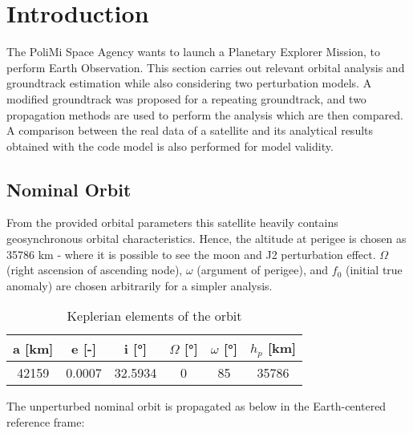 \section{Introduction}
\label{sec:introduction_cap2}

The PoliMi Space Agency wants to launch a Planetary Explorer Mission, to  perform  Earth Observation. This section carries out relevant orbital analysis and groundtrack estimation while also considering two perturbation models. A modified groundtrack was proposed for a repeating groundtrack, and two propagation methods are used to perform the analysis which are then compared. A comparison between the real data of a satellite and its analytical results obtained with the code model is also performed for model validity.


\subsection{Nominal Orbit}

From the provided orbital parameters this satellite heavily contains geosynchronous orbital characteristics. Hence, the altitude at perigee is chosen as 35786 km \cite{perigee_alt} - where it is possible to see the moon and J2 perturbation effect. $\Omega$ (right ascension of ascending node), $\omega$ (argument of perigee), and $f_0$ (initial true anomaly) are chosen arbitrarily for a simpler analysis.

\begin{table}[ht]
	\centering
	\label{tab:keplerian_elements}
	\begin{tabular}{|c|c|c|c|c|c|}
		\hline
		a [km] & e [-] & i [°] & $\Omega$ [°] & $\omega$ [°] & $h_p$ [km] \\
		\hline
		42159 & 0.0007 & 32.5934 & 0 & 85 & 35786 \\
		\hline
	\end{tabular}
	\caption{Keplerian elements of the orbit}
\end{table}

The unperturbed nominal orbit is propagated as below in the Earth-centered reference frame:

